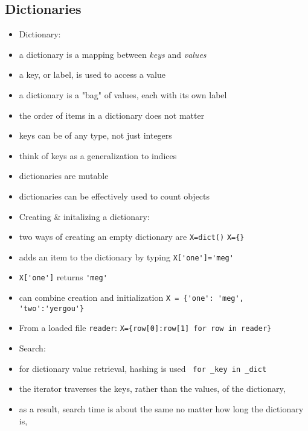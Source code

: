 \documentclass[onecolumn]{IEEEtran} %
\begin{document}
\subsection{Dictionaries}
\begin{itemize}
    \item Dictionary:
    \bi
        \item a dictionary is a mapping between \emph{keys} and \emph{values}
        \item a key, or label, is used to access a value
        \item a dictionary is a "bag" of values, each with its own label
        \bi
            \item the order of items in a dictionary does not matter
        \ei
        \item keys can be of any type, not just integers
        \item think of keys as a generalization to indices
        \item dictionaries are mutable
        \item dictionaries can be effectively used to count objects
    \ei
    \item Creating \& initalizing a dictionary:
    \bi
        \item two ways of creating an empty dictionary are \newline
        \verb|X=dict()| \newline
        \verb|X={}|
        \item adds an item to the dictionary by typing \newline
        \verb|X['one']='meg'|
        \bi
            \item \verb|X['one']| returns \verb|'meg'|
        \ei
        \item can combine creation and initialization \newline \verb|X = {'one': 'meg', 'two':'yergou'}|
    \ei
    \item From a loaded file \verb|reader|: \newline
    \verb|X={row[0]:row[1] for row in reader}|
    \item Search:
    \bi
        \item for dictionary value retrieval, hashing is used \newline \verb| for _key in _dict|
        \bi
            \item the iterator traverses the keys, rather than the values, of the dictionary,
        \ei
        \item as a result, search time is about the same no matter how long the dictionary is,

\end{itemize}
\end{document}
